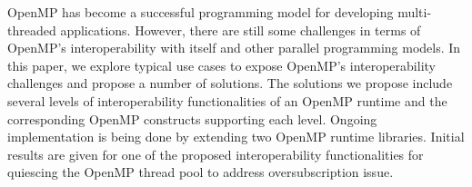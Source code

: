 OpenMP has become a successful programming model
for developing multi-threaded applications.
However, there are still some challenges in terms of OpenMP's interoperability
with itself and other parallel programming models.
In this paper, we explore typical use cases to expose OpenMP's interoperability challenges and
propose a number of solutions.
The solutions we propose include several levels of interoperability functionalities of an OpenMP runtime and
the corresponding OpenMP constructs supporting each level.
Ongoing implementation is being done by extending two OpenMP runtime libraries.
Initial results are given for one of the proposed interoperability functionalities 
for quiescing the OpenMP thread pool to address oversubscription issue. 
